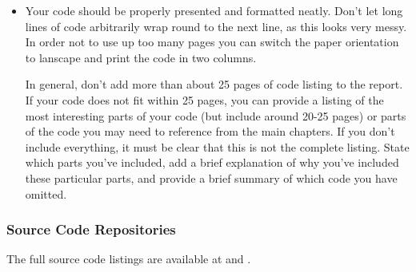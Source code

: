 \begin{mdframed}
	\begin{itemize}
		\item Your code should be properly presented and formatted neatly. Don't let
		long lines of code arbitrarily wrap round to the next line, as this looks
		very messy. In order not to use up too many pages you can switch the paper
		orientation to lanscape and print the code in two columns.

		In general, don't add more than about 25 pages of code listing to the
		report. If your code does not fit within 25 pages, you can provide a listing
		of the most interesting parts of your code (but include around 20-25 pages)
		or parts of the code you may need to reference from the main chapters. If
		you don't include everything, it must be clear that this is not the complete
		listing. State which parts you've included, add a brief explanation of why
		you've included these particular parts, and provide a brief summary of which
		code you have omitted.
	\end{itemize}
\end{mdframed}

\subsubsection{Source Code Repositories}

The full source code listings are available at \cite{heisentestInstrumentation}
and \cite{heisentestPlugin}.
